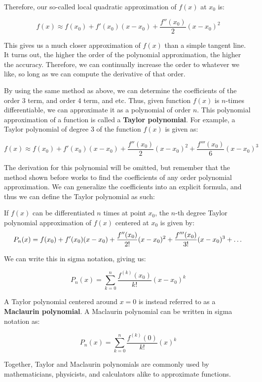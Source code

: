\documentclass[11pt]{article}
\begin{document}
Therefore, our so-called local quadratic approximation of $f(x)$ at $x_0$ is:

\[f(x) \approx f(x_0)+f'(x_0)(x-x_0)+\frac{f''(x_0)}{2}(x-x_0)^2\]

This gives us a much closer approximation of $f(x)$ than a simple tangent line. It turns out, the higher the order of the polynomial approximation, the higher the accuracy. Therefore, we can continually increase the order to whatever we like, so long as we can compute the derivative of that order. 

By using the same method as above, we can determine the coefficients of the order $3$ term, and order $4$ term, and etc. Thus, given function $f(x)$ is $n$-times differentiable, we can approximate it as a polynomial of order $n$. This polynomial approximation of a function is called a \textbf{Taylor polynomial}. For example, a Taylor polynomial of degree $3$ of the function $f(x)$ is given as:

\[f(x) \approx f(x_0)+f'(x_0)(x-x_0)+\frac{f''(x_0)}{2}(x-x_0)^2+\frac{f'''(x_0)}{6}(x-x_0)^3\]

The derivation for this polynomial will be omitted, but remember that the method shown before works to find the coefficients of any order polynomial approximation. We can generalize the coefficients into an explicit formula, and thus we can define the Taylor polynomial as such:\\

\begin{center}
If $f(x)$ can be differentiated $n$ times at point $x_0$, the $n$-th degree Taylor polynomial approximation of $f(x)$ centered at $x_0$ is given by:
\[P_n(x) = f(x_0)+f'(x_0)(x-x_0)+\frac{f''(x_0)}{2!}(x-x_0)^2+\frac{f'''(x_0)}{3!}(x-x_0)^3+ \text{\dots}\]
\end{center}
\vspace{0.5 cm}

We can write this in sigma notation, giving us:

\[P_n(x) = \sum_{k=0}^n \frac{f^{(k)}(x_0)}{k!}(x-x_0)^k\]

A Taylor polynomial centered around $x=0$ is instead referred to as a \textbf{Maclaurin polynomial}. A Maclaurin polynomial can be written in sigma notation as:

\[P_n(x) = \sum_{k=0}^n \frac{f^{(k)}(0)}{k!}(x)^k\]

Together, Taylor and Maclaurin polynomials are commonly used by mathematicians, physicists, and calculators alike to approximate functions.
\end{document}
